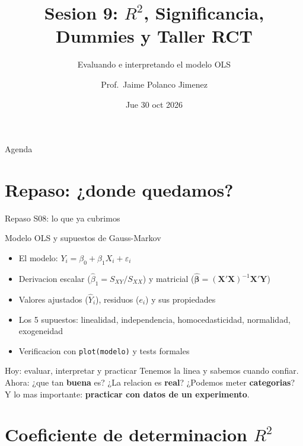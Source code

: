 \documentclass[aspectratio=169, 11pt]{beamer}
\title{Sesion 9: $R^2$, Significancia, Dummies y Taller RCT}
\subtitle{Evaluando e interpretando el modelo OLS}
\author{Prof.\ Jaime Polanco Jimenez}
\date{Jue 30 oct 2026}
\begin{document}
\begin{frame}
\titlepage
\end{frame}

\begin{frame}{Agenda}
\small
\tableofcontents
\end{frame}

\section{Repaso: ¿donde quedamos?}

\begin{frame}{Repaso S08: lo que ya cubrimos}
\small
\begin{block}{Modelo OLS y supuestos de Gauss-Markov}
\begin{itemize}\setlength{\itemsep}{2pt}
  \item El modelo: $Y_i = \beta_0 + \beta_1 X_i + \varepsilon_i$
  \item Derivacion escalar ($\hat{\beta}_1 = S_{XY}/S_{XX}$) y matricial ($\hat{\boldsymbol{\beta}} = (\mathbf{X}'\mathbf{X})^{-1}\mathbf{X}'\mathbf{Y}$)
  \item Valores ajustados ($\hat{Y}_i$), residuos ($e_i$) y sus propiedades
  \item Los 5 supuestos: linealidad, independencia, homocedasticidad, normalidad, exogeneidad
  \item Verificacion con \texttt{plot(modelo)} y tests formales
\end{itemize}
\end{block}

\begin{alertblock}{Hoy: evaluar, interpretar y practicar}
Tenemos la linea y sabemos cuando confiar. Ahora: ¿que tan \textbf{buena} es? ¿La relacion es \textbf{real}? ¿Podemos meter \textbf{categorias}? Y lo mas importante: \textbf{practicar con datos de un experimento}.
\end{alertblock}
\end{frame}

\section{Coeficiente de determinacion $R^2$}
\end{document}
